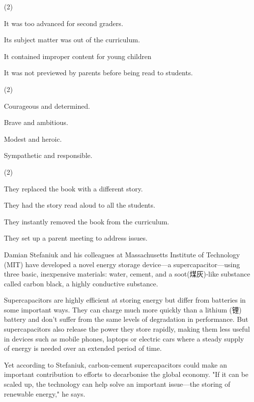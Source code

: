 \documentclass{英语试卷}
\begin{document}
\begin{choices}(2)
  \item It was too advanced for second graders.
  \item Its subject matter was out of the curriculum.
  \item It contained improper content for young children
  \item It was not previewed by parents before being read to students.
\end{choices}
\begin{choices}(2)
  \item Courageous and determined.
  \item Brave and ambitious.
  \item Modest and heroic.
  \item Sympathetic and responsible.
\end{choices}
\begin{choices}(2)
  \item They replaced the book with a different story.
  \item They had the story read aloud to all the students.
  \item They instantly removed the book from the curriculum.
  \item They set up a parent meeting to address issues.
\end{choices}
\par Damian Stefaniuk and his colleagues at Massachusetts Institute of Technology (MIT) have developed a novel energy storage device—a supercapacitor—using three basic, inexpensive materials: water, cement, and a soot(煤灰)-like substance called carbon black, a highly conductive substance.\par
\par Supercapacitors are highly efficient at storing energy but differ from batteries in some important ways. They can charge much more quickly than a lithium (锂) battery and don't suffer from the same levels of degradation in performance. But supercapacitors also release the power they store rapidly, making them less useful in devices such as mobile phones, laptops or electric cars where a steady supply of energy is needed over an extended period of time.\par
\par Yet according to Stefaniuk, carbon-cement supercapacitors could make an important contribution to efforts to decarbonise the global economy. "If it can be scaled up, the technology can help solve an important issue—the storing of renewable energy," he says.\par
\end{document}

